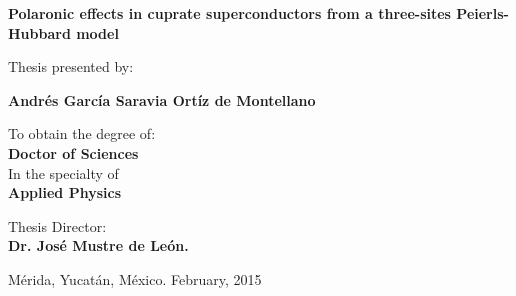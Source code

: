 \bs\bs\bs\bs
\begin{center}
  {\large \bf \bs \bf 
    \hspace{-2.8cm}
    \textsf{Polaronic effects in cuprate superconductors from a three-sites Peierls-Hubbard model}}
\end{center}
\bs\bs\bs
\begin{center}
  {\large 
    \hspace{-2.8cm}
    \textsf{Thesis presented by:}}
\end{center}
\bs\bs
\begin{center}
  {\large \bf 
    \hspace{-2.8cm}
    \textsf{Andrés García Saravia Ortíz de Montellano}} 
\end{center}
\bs
\begin{center} 
  {\large 
    \hspace{-2.8cm}
    \textsf{To obtain the degree of:}} \\ 
  \bs \smallskip 
  {\large \bf 
    \hspace{-2.8cm}
    \textsf{Doctor of Sciences}}\\ 
  \bs 
  {\large 
    \hspace{-2.8cm}
    \textsf{In the specialty of}} \\
  \bs
  {\bf \large 
    \hspace{-2.8cm}
    \textsf{Applied Physics}}
\end{center}
\bs\bs\bs
\begin{center}
  \large{\hspace{-2.8cm}
    \textsf{Thesis Director: \\
      \smallskip 
      \hspace{-2.8cm}
      \textbf{Dr. José Mustre de León.}}} \\
\end{center}
\bs\bs\bs\bs\bs\bs\bs
\begin{center}
  {\large 
    \hspace{-2.8cm}
    \textsf{Mérida, Yucatán, México.
      \hspace{5.3cm} February, 2015}}
\end{center}
